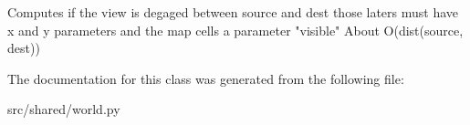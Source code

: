 \begin{DoxyVerb}Computes if the view is degaged between source and dest
those laters must have x and y parameters and the map
cells a parameter "visible"
About O(dist(source, dest))
\end{DoxyVerb}
 

\-The documentation for this class was generated from the following file\-:\begin{DoxyCompactItemize}
\item 
src/shared/world.\-py\end{DoxyCompactItemize}
